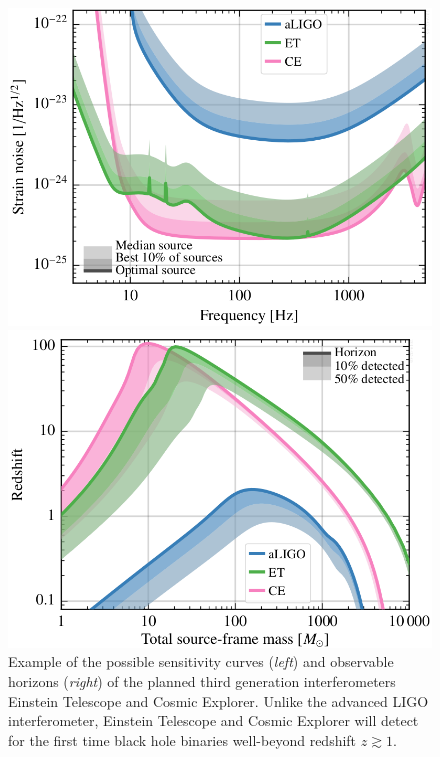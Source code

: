 \documentclass[a4paper,titlepage]{book}     	%
\begin{document}
\begin{figure}
	\begin{minipage}{.49\textwidth}
		\includegraphics[width=\textwidth]{./images/ETsensitivity.png}
	\end{minipage}
	\hfill
	\begin{minipage}{.49\textwidth}
		\vspace{-2mm}
		\includegraphics[width=1.02\textwidth]{./images/EThorizon.png}	
	\end{minipage}
	\caption{Example of the possible sensitivity curves (\emph{left}) and observable horizons (\emph{right}) of the planned third generation interferometers Einstein Telescope and Cosmic Explorer. Unlike the advanced LIGO interferometer, Einstein Telescope and Cosmic Explorer will detect for the first time black hole binaries well-beyond redshift $z \gtrsim 1$. \cite{EThorizonsensitivity}}\label{fig:ETsensitivity}
\end{figure}
\end{document}

